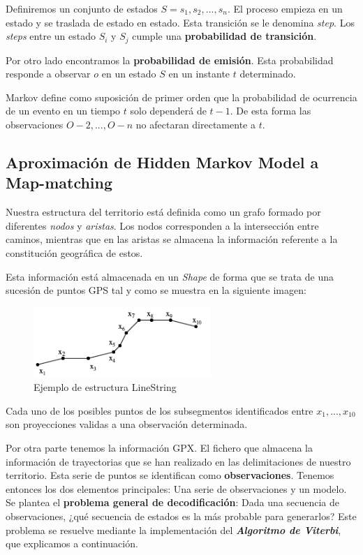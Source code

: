Definiremos un conjunto de estados $ S = {s_{1}, s_{2}, . . . , s_{n}}. $ El proceso empieza en un estado 
y se traslada de estado en estado. Esta transición se le denomina \textit{step}. Los \textit{steps} entre 
un estado $S_{i}$  y $S_{j}$ 
cumple una \textbf{probabilidad de transición}.

Por otro lado encontramos la \textbf{probabilidad de emisión}. Esta probabilidad responde a observar 
$o$ en un estado $S$ en un instante $t$ determinado.

Markov define como suposición de primer orden que la probabilidad de ocurrencia de un evento en 
un tiempo $t$ solo dependerá de $t-1$. De esta forma las observaciones ${O-2,..., O-n}$ no 
afectaran directamente a $t$.

\subsection{Aproximación de Hidden Markov Model a Map-matching}
Nuestra estructura del territorio está definida como un grafo formado por diferentes \textit{nodos} 
y \textit{aristas}. Los nodos corresponden a la intersección entre caminos, mientras que en las aristas 
se almacena la información referente a la constitución geográfica de estos.

Esta información está almacenada en un \textit{Shape} de forma que se trata de una sucesión de puntos 
\ac{GPS} tal 
y como se muestra en la siguiente imagen:
\begin{figure}[htb]
\begin{center}
\includegraphics[width=0.6\textwidth]{./Imagenes/LineString.png}
\caption{Ejemplo de estructura LineString}
\label{figure: LineString}
\end{center}
\end{figure}

Cada uno de los posibles puntos de los subsegmentos identificados entre $x_{1}, ..., x_{10}$ son proyecciones 
validas a una observación determinada.

Por otra parte tenemos la información \ac{GPX}. El fichero que almacena la información de trayectorias que 
se han realizado en las delimitaciones de nuestro territorio. Esta serie de puntos se identifican como 
\textbf{observaciones}. Tenemos entonces los dos elementos principales: Una serie de observaciones y 
un modelo. Se plantea el \textbf{problema general de decodificación}: Dada una secuencia de observaciones, 
¿qué secuencia de estados es la más probable para generarlos? Este problema se resuelve mediante la 
implementación del \textbf{\textit{Algoritmo de Viterbi}}, que explicamos a continuación.

